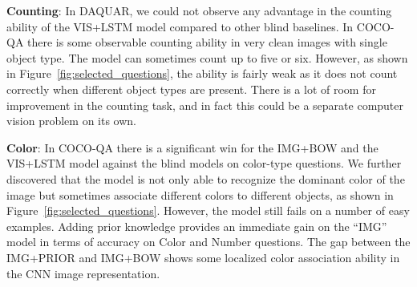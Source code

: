 \documentclass{article}
\renewcommand{\*}[1]{\textbf{#1}}
\begin{document}
\*{Counting}: In DAQUAR, we could not observe any advantage in the counting 
ability of the VIS+LSTM model compared to other blind baselines. In COCO-QA 
there is some observable counting ability in very clean images with single 
object type. The model can sometimes count up to five or six. However, as shown 
in Figure~\ref{fig:selected_questions}, the ability is fairly weak as it does 
not count correctly when different object types are present. There is a lot of 
room for improvement in the counting task, and in fact this could be a separate 
computer vision problem on its own. 

\*{Color}: In COCO-QA there is a significant win for the IMG+BOW and the 
VIS+LSTM model against the blind models on color-type questions. We further 
discovered that the model is not only able to recognize the dominant color of 
the image but sometimes associate different colors to different objects, as 
shown in Figure~\ref{fig:selected_questions}. However, the model still fails 
on a number of easy examples. Adding prior knowledge provides an immediate gain 
on the ``IMG'' model in terms of accuracy on Color and Number questions. The 
gap between the IMG+PRIOR and IMG+BOW shows some localized color association 
ability in the CNN image representation.
\end{document}
